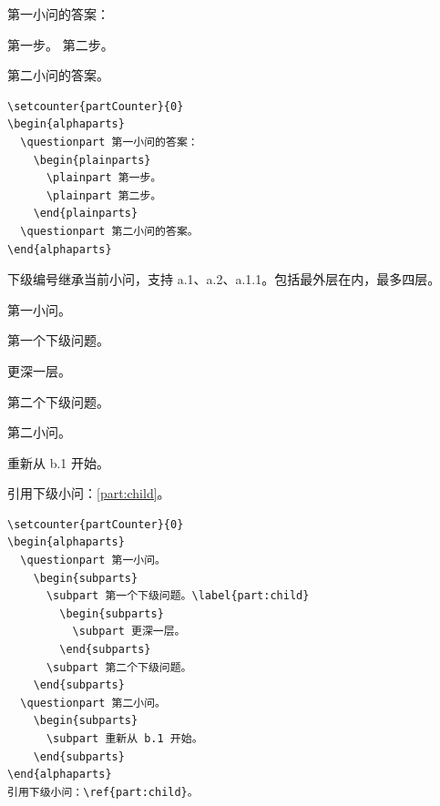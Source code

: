 \documentclass[nowatermark]{homework}
\begin{document}
\setcounter{partCounter}{0}
\begin{alphaparts}
  \questionpart 第一小问的答案：
    \begin{plainparts}
      \plainpart 第一步。
      \plainpart 第二步。
    \end{plainparts}
  \questionpart 第二小问的答案。
\end{alphaparts}
\begin{lstlisting}[language={[LaTeX]TeX},basicstyle=\ttfamily\footnotesize,numbers=none]
\setcounter{partCounter}{0}
\begin{alphaparts}
  \questionpart 第一小问的答案：
    \begin{plainparts}
      \plainpart 第一步。
      \plainpart 第二步。
    \end{plainparts}
  \questionpart 第二小问的答案。
\end{alphaparts}
\end{lstlisting}
\newpage
{}
下级编号继承当前小问，支持 a.1、a.2、a.1.1。包括最外层在内，最多四层。
\setcounter{partCounter}{0}
\begin{alphaparts}
  \questionpart 第一小问。
    \begin{subparts}
      \subpart 第一个下级问题。\label{part:child}
        \begin{subparts}
          \subpart 更深一层。
        \end{subparts}
      \subpart 第二个下级问题。
    \end{subparts}
  \questionpart 第二小问。
    \begin{subparts}
      \subpart 重新从 b.1 开始。
    \end{subparts}
\end{alphaparts}
引用下级小问：\ref{part:child}。
\begin{lstlisting}[language={[LaTeX]TeX},basicstyle=\ttfamily\footnotesize,numbers=none]
\setcounter{partCounter}{0}
\begin{alphaparts}
  \questionpart 第一小问。
    \begin{subparts}
      \subpart 第一个下级问题。\label{part:child}
        \begin{subparts}
          \subpart 更深一层。
        \end{subparts}
      \subpart 第二个下级问题。
    \end{subparts}
  \questionpart 第二小问。
    \begin{subparts}
      \subpart 重新从 b.1 开始。
    \end{subparts}
\end{alphaparts}
引用下级小问：\ref{part:child}。
\end{lstlisting}
\end{document}

